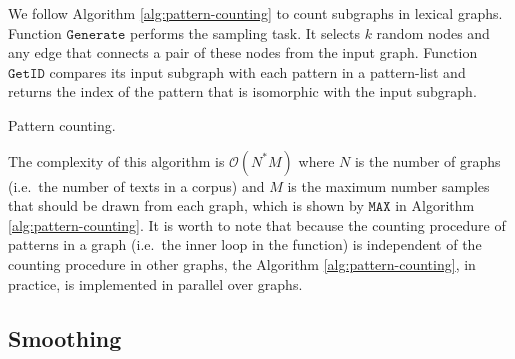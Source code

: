 We follow Algorithm \ref{alg:pattern-counting} to count subgraphs in lexical graphs.  
Function $\mathtt{Generate}$ performs the sampling task.  
It selects $k$ random nodes and any edge that connects a pair of these nodes from the input graph. 
Function $\mathtt{GetID}$ compares its input subgraph with each pattern in a pattern-list and returns the index of the pattern that is isomorphic with the input subgraph.  

\begin{algorithm}
    \begin{algorithmic}[1]
                \EndWhile
            \EndWhile
        \EndFunction
    \end{algorithmic}
    \caption{Pattern counting.}
    \label{alg:pattern-counting}
\end{algorithm}

The complexity of this algorithm is $\mathcal{O}(N^ \ast M)$  where $N$ is the number of graphs (i.e.\ the number of texts in a corpus) and $M$ is the maximum number samples that should be drawn from each graph, which is shown by $\mathtt{MAX}$ in Algorithm \ref{alg:pattern-counting}.
It is worth to note that because the counting procedure of patterns in a graph (i.e.\ the inner loop in the function) is independent of the counting procedure in other graphs, the Algorithm \ref{alg:pattern-counting}, in practice, is implemented in parallel over graphs. 
  
\subsection{Smoothing} 

